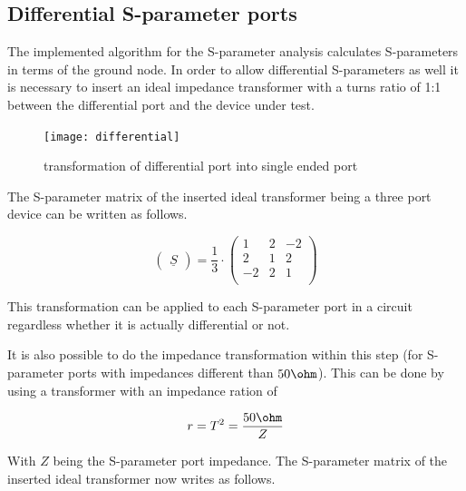 \documentclass[10pt]{report}
\begin{document}
\subsection{Differential S-parameter ports}
\label{sec:diffSParam}

The implemented algorithm for the S-parameter analysis calculates
S-parameters in terms of the ground node.  In order to allow
differential S-parameters as well it is necessary to insert an ideal
impedance transformer with a turns ratio of 1:1 between the
differential port and the device under test.

\begin{figure}[ht]
\begin{center}
\texttt{[image: differential]}
\end{center}
\caption{transformation of differential port into single ended port}
\label{fig:differential}
\end{figure}
\FloatBarrier

The S-parameter matrix of the inserted ideal transformer being a three
port device can be written as follows.

\begin{equation}
\begin{pmatrix}
\underline{S}
\end{pmatrix}
= \dfrac{1}{3}\cdot
\begin{pmatrix}
1 & 2 & -2\\
2 & 1 & 2\\
-2 & 2 & 1\\
\end{pmatrix}
\end{equation}

This transformation can be applied to each S-parameter port in a
circuit regardless whether it is actually differential or not.

\addvspace{12pt}

It is also possible to do the impedance transformation within this step
(for S-parameter ports with impedances different than $50\ohm$). This can
be done by using a transformer with an impedance ration of

\begin{equation}
r=T^2=\frac{50\ohm}{Z}
\end{equation}

With $Z$ being the S-parameter port impedance. The S-parameter matrix of
the inserted ideal transformer now writes as follows.
\end{document}
